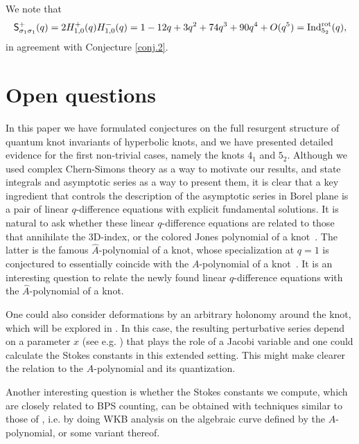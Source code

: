 \documentclass[12pt,reqno]{amsart}
\theoremstyle{definition}
\begin{document}
We note that 
\begin{equation}
  \mathsf{S}^+_{\sigma_1 \sigma_1}(q)=  2H_{1,0}^+(q) H_{1,0}^- (q)
  =1 -12 q +3 q^2 +74 q^3 + 90 q^4+ O(q^5)
  = {\rm Ind}^{\rm rot}_{5_2}(q), 
\end{equation}
in agreement with Conjecture \ref{conj.2}.
 

\section{Open questions}
\label{sec.open}

In this paper we have formulated conjectures on the full resurgent
structure of quantum knot invariants of hyperbolic knots, and we have
presented detailed evidence for the first non-trivial cases, namely
the knots $4_1$ and $5_2$.  Although we used complex Chern-Simons
theory as a way to motivate our results, and state integrals and
asymptotic series as a way to present them, it is clear that a key
ingredient that controls the description of the asymptotic series in
Borel plane is a pair of linear $q$-difference equations with explicit
fundamental solutions. It is natural to ask whether these linear
$q$-difference equations are related to those that annihilate the
3D-index, or the colored Jones polynomial of a knot~\cite{GL}.  The
latter is the famous $\widehat{A}$-polynomial of a knot, whose
specialization at $q=1$ is conjectured to essentially coincide with
the $A$-polynomial of a knot~\cite{Ga:AJ}. It is an interesting
question to relate the newly found linear $q$-difference equations
with the $\widehat{A}$-polynomial of a knot.

One could also consider deformations by an arbitrary holonomy around
the knot, which will be explored in \cite{GGM-peacock}. In
this case, the resulting perturbative series depend on a parameter $x$
(see e.g. \cite{DGLZ}) that plays the role of a Jacobi variable and
one could calculate the Stokes constants in this extended
setting. This might make clearer the relation to the $A$-polynomial
and its quantization.

Another interesting question is whether the Stokes constants we
compute, which are closely related to BPS counting, can be obtained
with techniques similar to those of \cite{gmn2}, i.e. by doing WKB
analysis on the algebraic curve defined by the $A$-polynomial, or some
variant thereof.
\end{document}
